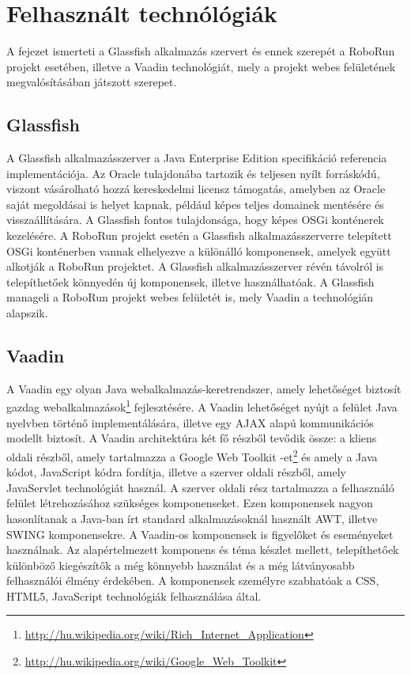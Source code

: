 \chapter{Felhasznált technólógiák}\label{ch:Technólógiák}

\begin{osszefoglal}
	A fejezet ismerteti a Glassfish alkalmazás szervert és ennek szerepét a RoboRun projekt esetében, illetve a Vaadin technológiát, mely a projekt webes felületének megvalósításában játszott szerepet.
\end{osszefoglal}


\section{Glassfish}\label{sec:Glassfish}
	
	A Glassfish alkalmazásszerver a Java Enterprise Edition specifikáció referencia implementációja. Az Oracle tulajdonába tartozik és teljesen nyílt forráskódú, viszont vásárolható hozzá kereskedelmi licensz támogatás, amelyben az Oracle saját megoldásai is helyet kapnak, például képes teljes domainek mentésére és visszaállítására. A Glassfish fontos tulajdonsága, hogy képes OSGi konténerek kezelésére. A RoboRun projekt esetén a Glassfish alkalmazásszerverre telepített OSGi konténerben vannak elhelyezve a különálló komponensek, amelyek együtt alkotják a RoboRun projektet. A Glassfish alkalmazásszerver révén távolról is telepíthetőek könnyedén új komponensek, illetve használhatóak. A Glassfish manageli a RoboRun projekt webes felületét is, mely Vaadin\cite{vaadin} a technológián alapszik. 

\section{Vaadin}\label{sec:Vaadin}

A Vaadin egy olyan Java webalkalmazás-keretrendszer, amely lehetőséget biztosít gazdag webalkalmazások\footnote{\href {http://hu.wikipedia.org/wiki/Rich\_Internet\_Application}{http://hu.wikipedia.org/wiki/Rich\_Internet\_Application}} fejlesztésére. A Vaadin lehetőséget nyújt a felület Java nyelvben történő implementálására, illetve egy AJAX alapú kommunikációs modellt biztosít. A Vaadin architektúra két fő részből tevődik össze: a kliens oldali részből, amely tartalmazza a Google Web Toolkit -et\footnote{\href {http://hu.wikipedia.org/wiki/Google\_Web\_Toolkit}{http://hu.wikipedia.org/wiki/Google\_Web\_Toolkit}} és amely a Java kódot, JavaScript kódra fordítja, illetve a szerver oldali részből, amely JavaServlet technológiát használ.
A szerver oldali rész tartalmazza a felhasználó felület létrehozásához szükséges komponenseket. Ezen komponensek nagyon hasonlítanak a Java-ban írt standard alkalmazásoknál használt AWT, illetve SWING komponensekre. A Vaadin-os komponensek is figyelőket és eseményeket használnak. Az alapértelmezett komponens és téma készlet mellett, telepíthetőek különböző kiegészítők a még könnyebb használat és a még látványosabb felhasználói élmény érdekében. A komponensek személyre szabhatóak a CSS, HTML5, JavaScript technológiák felhasználása által.


